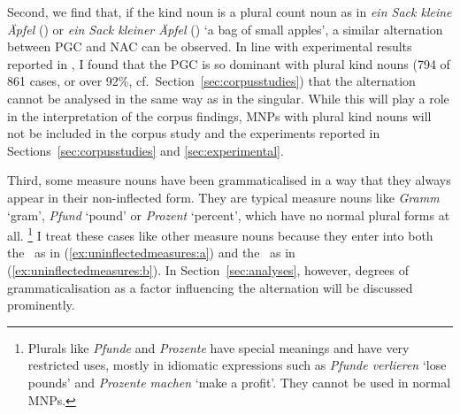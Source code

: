 Second, we find that, if the kind noun is a plural count noun as in \textit{ein Sack kleine Äpfel} (\NACa) or \textit{ein Sack kleiner Äpfel} (\PGCa) `a bag of small apples', a similar alternation between PGC and NAC can be observed.
In line with experimental results reported in \citet[15--16]{Zimmer2015}, I found that the PGC is so dominant with plural kind nouns (794 of 861 cases, or over 92\%, cf.\ Section~\ref{sec:corpusstudies}) that the alternation cannot be analysed in the same way as in the singular.
While this will play a role in the interpretation of the corpus findings, MNPs with plural kind nouns will not be included in the corpus study and the experiments reported in Sections~\ref{sec:corpusstudies} and \ref{sec:experimental}.

Third, some measure nouns have been grammaticalised in a way that they always appear in their non-inflected form.
They are typical measure nouns like \textit{Gramm} `gram', \textit{Pfund} `pound' or \textit{Prozent} `percent', which have no normal plural forms at all.%
\footnote{Plurals like \textit{Pfunde} and \textit{Prozente} have special meanings and have very restricted uses, mostly in idiomatic expressions such as \textit{Pfunde verlieren} `lose pounds' and \textit{Prozente machen} `make a profit'.
They cannot be used in normal MNPs.}
I treat these cases like other measure nouns because they enter into both the \NACa\ as in (\ref{ex:uninflectedmeasures:a}) and the \PGCa\ as in (\ref{ex:uninflectedmeasures:b}).
In Section~\ref{sec:analyses}, however, degrees of grammaticalisation as a factor influencing the alternation will be discussed prominently.

\begin{exe}
  \ex\label{ex:uninflectedmeasures}
  \begin{xlist}
  \end{xlist}
\end{exe}

